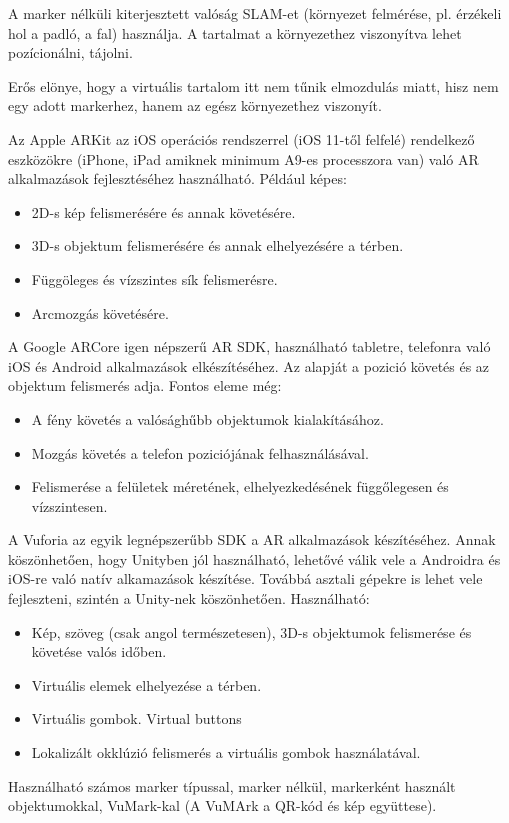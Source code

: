 A marker nélküli kiterjesztett valóság SLAM-et (környezet felmérése, pl. érzékeli hol a padló, a fal) használja. A tartalmat a környezethez viszonyítva lehet pozícionálni, tájolni.

Erős elönye, hogy a virtuális tartalom itt nem tűnik elmozdulás miatt, hisz nem egy adott markerhez,
hanem az egész környezethez viszonyít.



Az Apple ARKit az iOS operációs rendszerrel (iOS 11-től felfelé) rendelkező eszközökre (iPhone, iPad amiknek minimum A9-es processzora van) való AR alkalmazások fejlesztéséhez használható. 
Például képes: 
\begin{itemize}
\item 2D-s kép felismerésére és annak követésére.
\item 3D-s objektum felismerésére és annak elhelyezésére a térben.
\item Függöleges és vízszintes sík felismerésre.
\item Arcmozgás követésére.
\end{itemize}


A Google ARCore igen népszerű AR SDK, használható tabletre, telefonra való iOS és Android alkalmazások elkészítéséhez. Az alapját a pozició követés és az objektum felismerés adja.
Fontos eleme még:
\begin{itemize}
\item A fény követés a valósághűbb objektumok kialakításához.
\item Mozgás követés a telefon poziciójának felhasználásával.
\item Felismerése a  felületek méretének, elhelyezkedésének függőlegesen és vízszintesen.
\end{itemize}


A Vuforia az egyik legnépszerűbb SDK a AR alkalmazások készítéséhez. Annak köszönhetően, hogy Unityben jól használható, lehetővé válik vele a Androidra és iOS-re való natív alkamazások készítése. Továbbá asztali gépekre is lehet vele fejleszteni, szintén a Unity-nek köszönhetően. Használható:
\begin{itemize}
\item  Kép, szöveg (csak angol természetesen), 3D-s objektumok felismerése és követése valós időben.
\item  Virtuális elemek elhelyezése a térben.  
\item  Virtuális gombok. Virtual buttons
\item  Lokalizált okklúzió felismerés a virtuális gombok használatával.
\end{itemize}
Használható számos marker típussal, marker nélkül, markerként használt objektumokkal, VuMark-kal (A VuMArk a QR-kód és kép együttese). 

